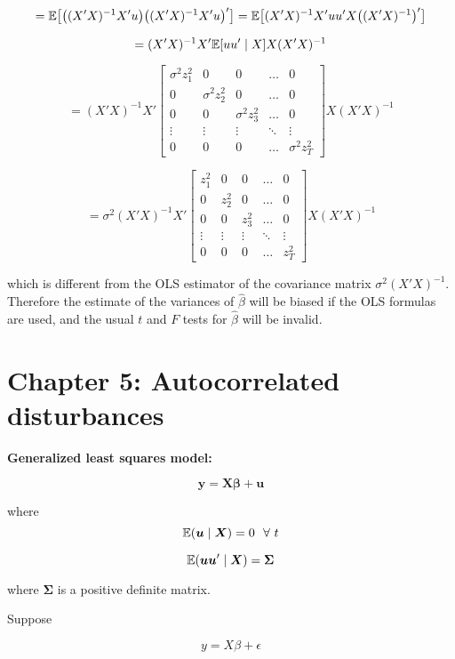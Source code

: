 \[
= \E \big[\big((X'X)^{-1}X'u\big)\big((X'X)^{-1}X'u \big) '\big] = \E \big[ (X'X)^{-1}X'uu'X\big((X'X)^{-1}\big)' \big]
\]

\[
= (X'X)^{-1}X' \E[uu' \mid X] X(X'X)^{-1}
\]

\[
= (X'X)^{-1}X' \begin{bmatrix}
    \sigma^2 z_1^2 &0 & 0 & \dots & 0 \\
   0 & \sigma^2 z_2^2 &0 & \dots  & 0 \\
   0 & 0 & \sigma^2 z_3^2 & \dots  & 0 \\
    \vdots & \vdots & \vdots & \ddots & \vdots \\
    0 & 0 &0 & \dots  & \sigma^2 z_T^2
\end{bmatrix}  X(X'X)^{-1}
\]

\[
= \sigma^2(X'X)^{-1}X' \begin{bmatrix}
    z_1^2 &0 & 0 & \dots & 0 \\
   0 & z_2^2 &0 & \dots  & 0 \\
   0 & 0 &  z_3^2 & \dots  & 0 \\
    \vdots & \vdots & \vdots & \ddots & \vdots \\
    0 & 0 &0 & \dots  &  z_T^2
\end{bmatrix}  X(X'X)^{-1}
\]

which is different from the OLS estimator of the covariance matrix \(\sigma^2(X'X)^{-1}\). Therefore the estimate of the variances of \(\hat{\beta}\) will be biased if the OLS formulas are used, and the usual \(t\) and \(F\) tests for \(\hat{\beta}\) will be invalid.



\section{Chapter 5: Autocorrelated disturbances}

\textbf{Generalized least squares model:}

\[
\boldsymbol{y} = \boldsymbol{X}\boldsymbol{\beta} + \boldsymbol{u}
\]

where
\[
\E(\boldsymbol{u} \mid \boldsymbol{X}) = 0 \ \ \forall \ t
\]

\[
\E(\boldsymbol{u} \boldsymbol{u}' \mid \boldsymbol{X}) = \boldsymbol{\Sigma} 
\]

where \(\boldsymbol{\Sigma}\) is a positive definite matrix.



Suppose

\[
y = X \beta + \epsilon
\]

